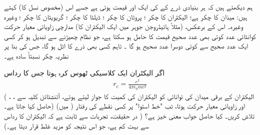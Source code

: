  ہم دیکھتے ہیں کہ ہر بنیادی ذرے کے  کی ایک  اور  قیمت ہوتی ہے جسے اس (مخصوص نسل کا)   کہتے ہیں:   میذان  کا چکر  ہے؛  الیکٹران کا چکر ؛  پروٹان کا چکر ؛  ڈیلٹا کا چکر ؛  گریویٹان کا چکر ؛  وغیرہ وغیرہ۔ اس کے برعکس، (مثلاً   ہائیڈروجن جوہر میں ایک الیکٹران کا) مدارچی زاویائی معیار حرکت کوانٹائی عدد  کوئی بھی عدد صحیح قیمت  کا حامل ہو  سکتا ہے، جو نظام چھیڑنے سے تبدیل ہو کر کسی ایک  عدد  صحیح سے کوئی  دوسرا عدد صحیح  ہو گا ۔ تاہم کسی بھی ذرے کا  اٹل ہو گا،  جس کی بنا پر نظریہ چکر نسبتاً  سادہ ہے۔ 

اگر الیکٹران ایک کلاسیکی ٹھوس کرہ ہوتا جس کا رداس 
\begin{align}
r_c = \frac{e^2}{4 \pi \epsilon_0 m c ^2}
\end{align}
(  الیکٹران کے برقی میدان کی توانائی کو الیکٹران کی کمیت کا جواز لیتے ہوئے،  آئنشٹائن کلیہ   سے   ، ،   حاصل کیا جاتا ہے۔) اور    زاویائی معیار حرکت  ہوتا، تب "خط    استوا"    پر کسی 
نقطے کی رفتار (  میں)  تلاش کریں۔ کیا حاصل جواب معنی خیز ہے؟  ( در حقیقت،  تجربات سے ثابت  ہے کہ الیکٹران کا رداس  سے بہت کم ہے،  جو اس نتیجہ کو  مزید غلط قرار   دیتا ہے۔) 


